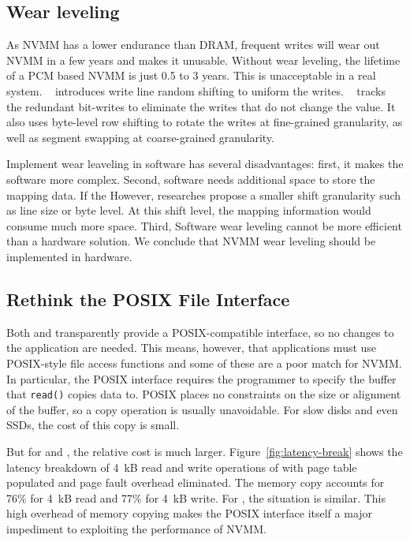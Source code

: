 \subsection{Wear leveling}
\label{sec:wear}
As NVMM has a lower endurance than DRAM, frequent writes will wear out
NVMM in a few years and makes it unusable. Without wear leveling, the lifetime
of a PCM based NVMM is just 0.5 to 3 years. This is unacceptable in a real
system. ~\cite{PCMHierarchy} introduces write line random shifting to uniform
the writes. ~\cite{PCM_EfficientMainMemory} tracks the redundant bit-writes to
eliminate the writes that do not change the value. It also uses byte-level row
shifting to rotate the writes at fine-grained granularity, as well as segment
swapping at coarse-grained granularity.

Implement wear leaveling in software has several disadvantages: first, it makes
the software more complex. Second, software needs additional space to store
the mapping data. If the 
However, researches propose a smaller shift granularity such as line size
or byte level.
At this shift level, the mapping information would consume much more space.
Third, Software wear leveling cannot be more efficient
than a hardware solution. We conclude that NVMM wear leveling should be
implemented in hardware.

\subsection{Rethink the POSIX File Interface}
\label{sec:noposix}

Both \DAChell{} and \CChell{} transparently provide a POSIX-compatible
interface, so no changes to the application are needed.  This means, however, that applications must use POSIX-style file access functions and some of these are a poor match for NVMM.
In particular, the POSIX interface
requires the programmer to specify the buffer that \texttt{read()} copies data to.
POSIX places no constraints on the size
or alignment of the buffer, so a copy operation is usually unavoidable.  For
slow disks and even SSDs, the cost of this copy is small.


But for \DAChell{} and \CChell{}, the relative cost is much larger.
Figure~\ref{fig:latency-break} shows the latency breakdown of 4~kB read and
write operations of \DAChell{} with page table populated and page fault overhead
eliminated.  The memory copy accounts for 76\% for 4~kB
read and 77\% for 4~kB write. For \CChell{}, the situation is similar.
This high overhead of memory copying makes the POSIX interface
itself a major impediment to exploiting the performance of NVMM.

